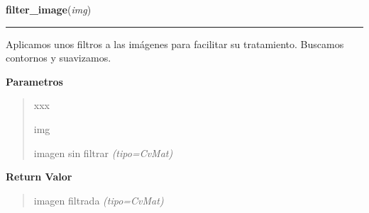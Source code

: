 \hspace{.8\funcindent}\begin{boxedminipage}{\funcwidth}

    \raggedright \textbf{filter\_image}(\textit{img})

    \vspace{-1.5ex}

    \rule{\textwidth}{0.5\fboxrule}
\setlength{\parskip}{2ex}
Aplicamos unos filtros a las imágenes para facilitar su tratamiento. Buscamos contornos y suavizamos.

\setlength{\parskip}{1ex}
      \textbf{Parametros}
      \vspace{-1ex}

      \begin{quote}
        \begin{Ventry}{xxx}

          \item[img]


imagen sin filtrar
            {\it (tipo=CvMat)}

        \end{Ventry}

      \end{quote}

      \textbf{Return Valor}
    \vspace{-1ex}

      \begin{quote}

imagen filtrada
      {\it (tipo=CvMat)}

      \end{quote}

    \end{boxedminipage}

    \label{src:search_goban:detect_contour}

    \vspace{0.5ex}

